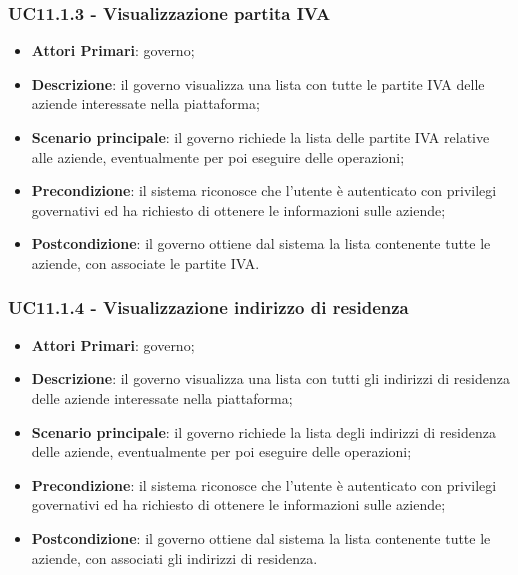 \subsubsection{UC11.1.3 - Visualizzazione partita IVA}
\begin{itemize}
	\item \textbf{Attori Primari}: governo;
	\item \textbf{Descrizione}: il governo visualizza una lista con tutte le partite IVA delle aziende interessate nella piattaforma;
	\item \textbf{Scenario principale}: il governo richiede la lista delle partite IVA relative alle aziende, eventualmente per poi eseguire delle operazioni;
	\item \textbf{Precondizione}: il sistema riconosce che l'utente è autenticato con privilegi governativi ed ha richiesto di ottenere le informazioni sulle aziende;
	\item \textbf{Postcondizione}: il governo ottiene dal sistema la lista contenente tutte le aziende, con associate le partite IVA.
\end{itemize}
\subsubsection{UC11.1.4 - Visualizzazione indirizzo di residenza}
\begin{itemize}
	\item \textbf{Attori Primari}: governo;
	\item \textbf{Descrizione}: il governo visualizza una lista con tutti gli indirizzi di residenza delle aziende interessate nella piattaforma;
	\item \textbf{Scenario principale}: il governo richiede la lista degli indirizzi di residenza delle aziende, eventualmente per poi eseguire delle operazioni;
	\item \textbf{Precondizione}: il sistema riconosce che l'utente è autenticato con privilegi governativi ed ha richiesto di ottenere le informazioni sulle aziende;
	\item \textbf{Postcondizione}: il governo ottiene dal sistema la lista contenente tutte le aziende, con associati gli indirizzi di residenza.
\end{itemize}

